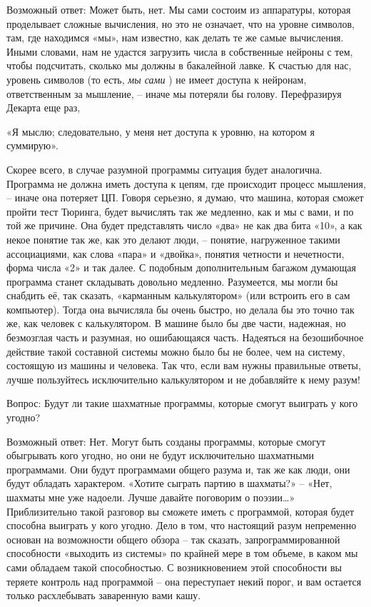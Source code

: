 \documentclass[../main.tex]{subfiles}
\begin{document}
Возможный ответ: Может быть, нет. Мы сами состоим из аппаратуры, которая проделывает сложные вычисления, но это не означает, что на уровне символов, там, где находимся «мы», нам известно, как делать те же самые вычисления. Иными словами, нам не удастся загрузить числа в собственные нейроны с тем, чтобы подсчитать, сколько мы должны в бакалейной лавке. К счастью для нас, уровень символов (то есть, \emph{мы сами} ) не имеет доступа к нейронам, ответственным за мышление, \--- иначе мы потеряли бы голову. Перефразируя Декарта еще раз,

«Я мыслю; следовательно, у меня нет доступа к уровню, на котором я суммирую».

Скорее всего, в случае разумной программы ситуация будет аналогична. Программа не должна иметь доступа к цепям, где происходит процесс мышления, \--- иначе она потеряет ЦП. Говоря серьезно, я думаю, что машина, которая сможет пройти тест Тюринга, будет вычислять так же медленно, как и мы с вами, и по той же причине. Она будет представлять число «два» не как два бита «10», а как некое понятие так же, как это делают люди, \--- понятие, нагруженное такими ассоциациями, как слова «пара» и «двойка», понятия четности и нечетности, форма числа «2» и так далее. С подобным дополнительным багажом думающая программа станет складывать довольно медленно. Разумеется, мы могли бы снабдить её, так сказать, «карманным калькулятором» (или встроить его в сам компьютер). Тогда она вычисляла бы очень быстро, но делала бы это точно так же, как человек с калькулятором. В машине было бы две части, надежная, но безмозглая часть и разумная, но ошибающаяся часть. Надеяться на безошибочное действие такой составной системы можно было бы не более, чем на систему, состоящую из машины и человека. Так что, если вам нужны правильные ответы, лучше пользуйтесь исключительно калькулятором и не добавляйте к нему разум!

Вопрос: Будут ли такие шахматные программы, которые смогут выиграть у кого угодно?

Возможный ответ: Нет. Могут быть созданы программы, которые смогут обыгрывать кого угодно, но они не будут исключительно шахматными программами. Они будут программами общего разума и, так же как люди, они будут обладать характером. «Хотите сыграть партию в шахматы?» \--- «Нет, шахматы мне уже надоели. Лучше давайте поговорим о поэзии\ldots» Приблизительно такой разговор вы сможете иметь с программой, которая будет способна выиграть у кого угодно. Дело в том, что настоящий разум непременно основан на возможности общего обзора \--- так сказать, запрограммированной способности «выходить из системы» по крайней мере в том объеме, в каком мы сами обладаем такой способностью. С возникновением этой способности вы теряете контроль над программой \--- она переступает некий порог, и вам остается только расхлебывать заваренную вами кашу.
\end{document}
